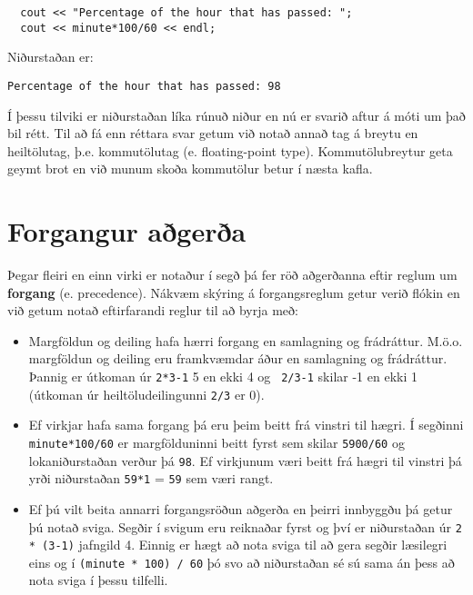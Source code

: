\begin{verbatim}
  cout << "Percentage of the hour that has passed: ";
  cout << minute*100/60 << endl;
\end{verbatim}
%
Niðurstaðan er:

\begin{verbatim}
Percentage of the hour that has passed: 98
\end{verbatim}
%
Í þessu tilviki er niðurstaðan líka rúnuð niður en nú er svarið aftur á móti um það bil rétt.
Til að fá enn réttara svar getum við notað annað tag á breytu en heiltölutag, þ.e. kommutölutag (e. floating-point type).
Kommutölubreytur geta geymt brot en við munum skoða kommutölur betur í næsta kafla.

\section{Forgangur aðgerða}

Þegar fleiri en einn virki er notaður í segð þá fer röð aðgerðanna eftir reglum um {\bf forgang} (e. precedence).
Nákvæm skýring á forgangsreglum getur verið flókin en við getum notað eftirfarandi reglur til að byrja með:

\begin{itemize}

\item Margföldun og deiling hafa hærri forgang en samlagning og frádráttur.
M.ö.o. margföldun og deiling eru framkvæmdar áður en samlagning og frádráttur.
Þannig er útkoman úr {\tt 2*3-1} 5 en ekki 4 og {\tt
2/3-1} skilar -1 en ekki 1 (útkoman úr heiltöludeilingunni {\tt 2/3} er 0).

\item Ef virkjar hafa sama forgang þá eru þeim beitt frá vinstri til hægri.
Í segðinni {\tt minute*100/60} er margfölduninni beitt fyrst sem skilar {\tt 5900/60} og lokaniðurstaðan verður þá {\tt 98}.
Ef virkjunum væri beitt frá hægri til vinstri þá yrði niðurstaðan {\tt 59*1} = {\tt 59} sem væri rangt.

\item Ef þú vilt beita annarri forgangsröðun aðgerða en þeirri innbyggðu þá getur þú notað sviga.
Segðir í svigum eru reiknaðar fyrst og því er niðurstaðan úr {\tt 2 * (3-1)} jafngild 4.
Einnig er hægt að nota sviga til að gera segðir læsilegri eins og í {\tt (minute * 100) / 60} þó svo að niðurstaðan sé sú sama án þess að nota sviga í þessu tilfelli.

\end{itemize}

